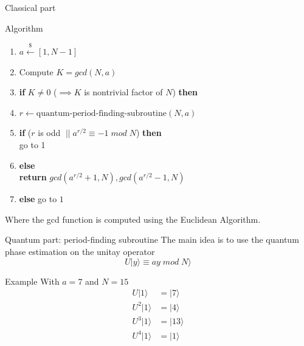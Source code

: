 \documentclass{beamer}
\begin{document}
    \begin{frame}{Classical part}
        \begin{alertblock}{Algorithm}
            \begin{enumerate}
                \item $a \overset{\$}{\leftarrow} [1, N-1]$
                \item Compute $K = gcd(N,a)$
                \item \textbf{if} $K \neq 0 $ ($\implies K$ is nontrivial factor of $N$) \textbf{then}
                \item \hspace{0.5cm} $r \leftarrow \text{quantum-period-finding-subroutine}(N,a)$
                \item \hspace{0.5cm} \textbf{if} ($r$ is odd $\; || \; a^{r/2} \equiv -1 \; mod \; N$)   \textbf{then} \\ \hspace{1cm} go to 1
                \item \hspace{0.5cm} \textbf{else} \\ \hspace{1cm} \textbf{return} $gcd(a^{r/2} + 1, N), gcd(a^{r/2} - 1, N)$
                \item \textbf{else} go to $1$
            \end{enumerate}
        \end{alertblock}

        Where the gcd function is computed using the Euclidean Algorithm.
    \end{frame}

    \begin{frame}{Quantum part: period-finding subroutine}
        The main idea is to use the quantum phase estimation on the unitay
        operator $$ U|y \rangle \equiv ay \; mod \; N \rangle$$

        \begin{exampleblock}{Example}
            With $a = 7$ and $N = 15$
            \begin{align*}
                U|1 \rangle &= |7 \rangle \\
                U^2|1 \rangle &= |4 \rangle \\
                U^3|1 \rangle &= |13 \rangle \\
                U^4|1 \rangle &= |1 \rangle
            \end{align*}
        \end{exampleblock}
    \end{frame}
\end{document}
